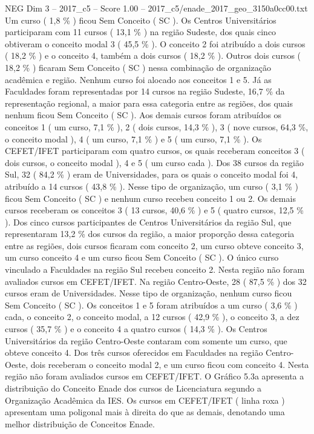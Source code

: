 \begin{textsample}{NEG Dim 3 – 2017\_c5 – Score 1.00 – 2017\_c5/enade\_2017\_geo\_3150a0cc00.txt}
Um curso ( 1,8 \% ) ficou Sem Conceito ( SC ).
Os Centros Universitários participaram com 11 cursos ( 13,1 \% ) na região Sudeste, dos quais cinco obtiveram o conceito modal 3 ( 45,5 \% ).
O conceito 2 foi atribuído a dois cursos ( 18,2 \% ) e o conceito 4, também a dois cursos ( 18,2 \% ).
Outros dois cursos ( 18,2 \% ) ficaram Sem Conceito ( SC ) nessa combinação de organização acadêmica e região.
Nenhum curso foi alocado aos conceitos 1 e 5.
Já as Faculdades foram representadas por 14 cursos na região Sudeste, 16,7 \% da representação regional, a maior para essa categoria entre as regiões, dos quais nenhum ficou Sem Conceito ( SC ).
Aos demais cursos foram atribuídos os conceitos 1 ( um curso, 7,1 \% ), 2 ( dois cursos, 14,3 \% ), 3 ( nove cursos, 64,3 \%, o conceito modal ), 4 ( um curso, 7,1 \% ) e 5 ( um curso, 7,1 \% ).
Os CEFET/IFET participaram com quatro cursos, os quais receberam conceitos 3 ( dois cursos, o conceito modal ), 4 e 5 ( um curso cada ).
Dos 38 cursos da região Sul, 32 ( 84,2 \% ) eram de Universidades, para os quais o conceito modal foi 4, atribuído a 14 cursos ( 43,8 \% ).
Nesse tipo de organização, um curso ( 3,1 \% ) ficou Sem Conceito ( SC ) e nenhum curso recebeu conceito 1 ou 2.
Os demais cursos receberam os conceitos 3 ( 13 cursos, 40,6 \% ) e 5 ( quatro cursos, 12,5 \% ).
Dos cinco cursos participantes de Centros Universitários da região Sul, que representaram 13,2 \% dos cursos da região, a maior proporção dessa categoria entre as regiões, dois cursos ficaram com conceito 2, um curso obteve conceito 3, um curso conceito 4 e um curso ficou Sem Conceito ( SC ).
O único curso vinculado a Faculdades na região Sul recebeu conceito 2.
Nesta região não foram avaliados cursos em CEFET/IFET.
Na região Centro-Oeste, 28 ( 87,5 \% ) dos 32 cursos eram de Universidades.
Nesse tipo de organização, nenhum curso ficou Sem Conceito ( SC ).
Os conceitos 1 e 5 foram atribuídos a um curso ( 3,6 \% ) cada, o conceito 2, o conceito modal, a 12 cursos ( 42,9 \% ), o conceito 3, a dez cursos ( 35,7 \% ) e o conceito 4 a quatro cursos ( 14,3 \% ).
Os Centros Universitários da região Centro-Oeste contaram com somente um curso, que obteve conceito 4.
Dos três cursos oferecidos em Faculdades na região Centro-Oeste, dois receberam o conceito modal 2, e um curso ficou com conceito 4.
Nesta região não foram avaliados cursos em CEFET/IFET.
O Gráfico 5.3a apresenta a distribuição do Conceito Enade dos cursos de Licenciatura segundo a Organização Acadêmica da IES.
Os cursos em CEFET/IFET ( linha roxa ) apresentam uma poligonal mais à direita do que as demais, denotando uma melhor distribuição de Conceitos Enade.

\end{textsample}
